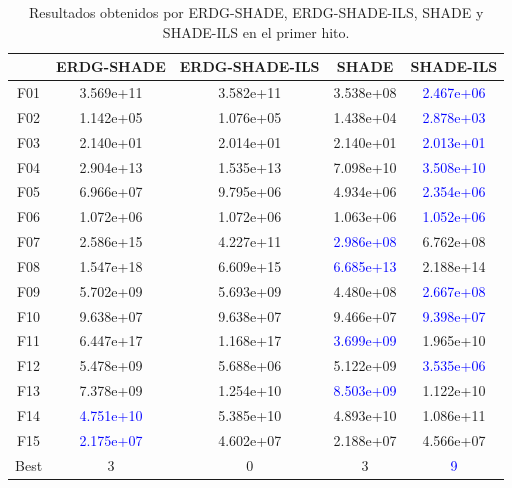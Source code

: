 \begin{table}[h]
\centering
\begin{tabular}{ccccc}
\toprule
{} &  \textbf{ERDG-SHADE} & \textbf{ERDG-SHADE-ILS} & \textbf{SHADE} & \textbf{SHADE-ILS} \\
\midrule
F01  &  3.569e+11 &    3.582e+11 &  3.538e+08 &  \textcolor{blue}{2.467e+06} \\
F02  &  1.142e+05 &    1.076e+05 &  1.438e+04 &  \textcolor{blue}{2.878e+03} \\
F03  &  2.140e+01 &    2.014e+01 &  2.140e+01 &  \textcolor{blue}{2.013e+01} \\
F04  &  2.904e+13 &    1.535e+13 &  7.098e+10 &  \textcolor{blue}{3.508e+10} \\
F05  &  6.966e+07 &    9.795e+06 &  4.934e+06 &  \textcolor{blue}{2.354e+06} \\
F06  &  1.072e+06 &    1.072e+06 &  1.063e+06 &  \textcolor{blue}{1.052e+06} \\
F07  &  2.586e+15 &    4.227e+11 &  \textcolor{blue}{2.986e+08} &  6.762e+08 \\
F08  &  1.547e+18 &    6.609e+15 &  \textcolor{blue}{6.685e+13} &  2.188e+14 \\
F09  &  5.702e+09 &    5.693e+09 &  4.480e+08 &  \textcolor{blue}{2.667e+08} \\
F10  &  9.638e+07 &    9.638e+07 &  9.466e+07 &  \textcolor{blue}{9.398e+07} \\
F11  &  6.447e+17 &    1.168e+17 &  \textcolor{blue}{3.699e+09} &  1.965e+10 \\
F12  &  5.478e+09 &    5.688e+06 &  5.122e+09 &  \textcolor{blue}{3.535e+06} \\
F13  &  7.378e+09 &    1.254e+10 &  \textcolor{blue}{8.503e+09} &  1.122e+10 \\
F14  &  \textcolor{blue}{4.751e+10} &    5.385e+10 &  4.893e+10 &  1.086e+11 \\
F15  &  \textcolor{blue}{2.175e+07} &    4.602e+07 &  2.188e+07 &  4.566e+07 \\
Best &          3 &            0 &          3 &         \textcolor{blue}{9} \\
\bottomrule
\end{tabular}
\caption{Resultados obtenidos por ERDG-SHADE, ERDG-SHADE-ILS, SHADE y SHADE-ILS en el primer hito.}
\label{tab:resultados_erdg_shade_1}
\end{table}

